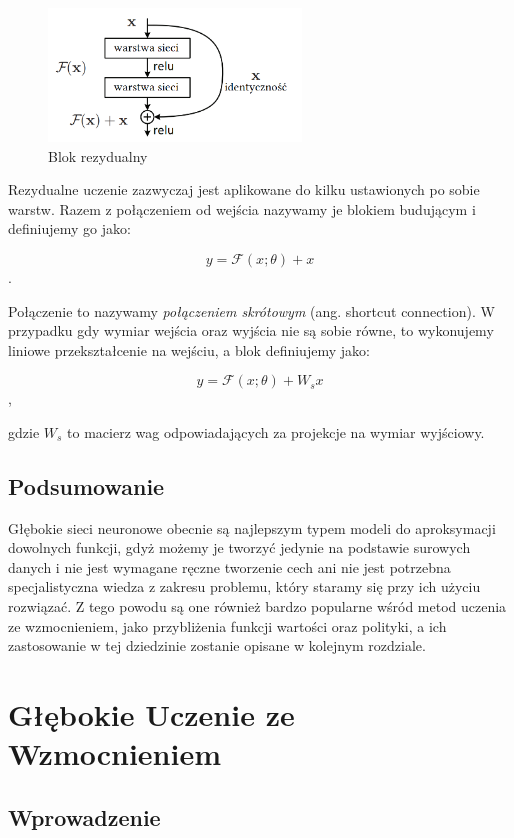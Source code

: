 \documentclass[licencjacka]{pracamgr}
\begin{document}
\begin{figure}[ht!]
  \centering
  \includegraphics[width=0.6\textwidth]{res_block}
  \caption{Blok rezydualny}
\end{figure}

Rezydualne uczenie zazwyczaj jest aplikowane do kilku ustawionych po sobie warstw. Razem z połączeniem od wejścia nazywamy je blokiem budującym i definiujemy go jako:

$$ y = \mathcal{F}(x; \theta) + x $$.

Połączenie to nazywamy \emph{połączeniem skrótowym} (ang. shortcut connection). W przypadku gdy wymiar wejścia oraz wyjścia nie są sobie równe, to wykonujemy liniowe przekształcenie na wejściu, a blok definiujemy jako:

$$ y = \mathcal{F}(x; \theta) + W_sx $$,

gdzie $W_s$ to macierz wag odpowiadających za projekcje na wymiar wyjściowy.

\section{Podsumowanie}

Głębokie sieci neuronowe obecnie są najlepszym typem modeli do aproksymacji dowolnych funkcji, gdyż możemy je tworzyć jedynie na podstawie surowych danych i nie jest wymagane ręczne tworzenie cech ani nie jest potrzebna specjalistyczna wiedza z zakresu problemu, który staramy się przy ich użyciu rozwiązać. Z tego powodu są one również bardzo popularne wśród metod uczenia ze wzmocnieniem, jako przybliżenia funkcji wartości oraz polityki, a ich zastosowanie w tej dziedzinie zostanie opisane w kolejnym rozdziale.

\chapter{Głębokie Uczenie ze Wzmocnieniem}

\section{Wprowadzenie}
\end{document}
